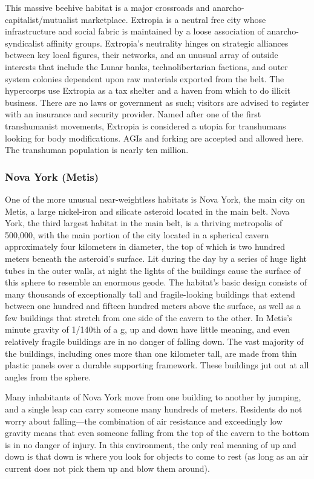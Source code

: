 This massive beehive habitat is a major crossroads and anarcho-capitalist/mutualist marketplace. Extropia is a neutral free city whose infrastructure and social fabric is maintained by a loose association of anarcho-syndicalist affinity groups. Extropia's neutrality hinges on strategic alliances between key local figures, their networks, and an unusual array of outside interests that include the Lunar banks, technolibertarian factions, and outer system colonies dependent upon raw materials exported from the belt. The hypercorps use Extropia as a tax shelter and a haven from which to do illicit business. There are no laws or government as such; visitors are advised to register with an insurance and security provider. Named after one of the first transhumanist movements, Extropia is considered a utopia for transhumans looking for body modifications. AGIs and forking are accepted and allowed here. The transhuman population is nearly ten million. 

\subsubsection{Nova York (Metis)} \label{sec:nova-york-metis} 

One of the more unusual near-weightless habitats is Nova York, the main city on Metis, a large nickel-iron and silicate asteroid located in the main belt. Nova York, the third largest habitat in the main belt, is a thriving metropolis of 500,000, with the main portion of the city located in a spherical cavern approximately four kilometers in diameter, the top of which is two hundred meters beneath the asteroid's surface. Lit during the day by a series of huge light tubes in the outer walls, at night the lights of the buildings cause the surface of this sphere to resemble an enormous geode. The habitat's basic design consists of many thousands of exceptionally tall and fragile-looking buildings that extend between one hundred and fifteen hundred meters above the surface, as well as a few buildings that stretch from one side of the cavern to the other. In Metis's minute gravity of 1/140th of a g, up and down have little meaning, and even relatively fragile buildings are in no danger of falling down. The vast majority of the buildings, including ones more than one kilometer tall, are made from thin plastic panels over a durable supporting framework. These buildings jut out at all angles from the sphere. 

Many inhabitants of Nova York move from one building to another by jumping, and a single leap can carry someone many hundreds of meters. Residents do not worry about falling—the combination of air resistance and exceedingly low gravity means that even someone falling from the top of the cavern to the bottom is in no danger of injury. In this environment, the only real meaning of up and down is that down is where you look for objects to come to rest (as long as an air current does not pick them up and blow them around). 


